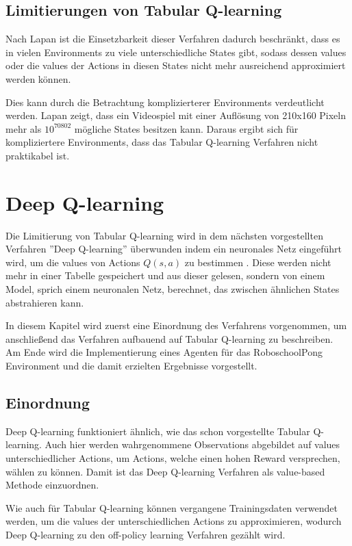 \documentclass[11pt]{scrartcl}
\begin{document}
\subsection{Limitierungen von Tabular Q-learning}
\label{sec:tabular_q_learning_limits}
Nach Lapan\cite[~S.192]{L2018} ist die Einsetzbarkeit dieser Verfahren dadurch
beschränkt, dass es in vielen Environments zu viele unterschiedliche States gibt, sodass
dessen values oder die values der Actions in diesen States nicht mehr ausreichend
approximiert werden können.

Dies kann durch die Betrachtung komplizierterer Environments verdeutlicht werden. Lapan
\cite[~S.192]{L2018} zeigt, dass ein Videospiel mit einer Auflösung von 210x160 Pixeln
mehr als $10^{70802}$ mögliche States besitzen kann. Daraus ergibt sich für
kompliziertere Environments, dass das Tabular Q-learning Verfahren nicht praktikabel ist.


\section{Deep Q-learning}
\label{sec:dqn}
Die Limitierung von Tabular Q-learning wird in dem nächsten vorgestellten Verfahren
''Deep Q-learning'' überwunden indem ein neuronales Netz eingeführt wird, um die values
von Actions $Q(s, a)$ zu bestimmen \cite[~S.199 ff.]{L2018}. Diese werden nicht mehr in
einer Tabelle gespeichert und aus dieser gelesen, sondern von einem Model, sprich einem
neuronalen Netz, berechnet, das zwischen ähnlichen States abstrahieren kann.

In diesem Kapitel wird zuerst eine Einordnung des Verfahrens vorgenommen, um anschließend
das Verfahren aufbauend auf Tabular Q-learning zu beschreiben. Am Ende wird die	
Implementierung eines Agenten für das RoboschoolPong Environment und die damit erzielten
Ergebnisse vorgestellt.

\subsection{Einordnung}
Deep Q-learning funktioniert ähnlich, wie das schon vorgestellte Tabular Q-learning. Auch
hier werden wahrgenommene Observations abgebildet auf values unterschiedlicher Actions, um
Actions, welche einen hohen Reward versprechen, wählen zu können. Damit ist das Deep 
Q-learning Verfahren als value-based Methode einzuordnen.

Wie auch für Tabular Q-learning können vergangene Trainingsdaten verwendet werden, um die
values der unterschiedlichen Actions zu approximieren, wodurch Deep Q-learning zu den
off-policy learning Verfahren gezählt wird.
\end{document}
